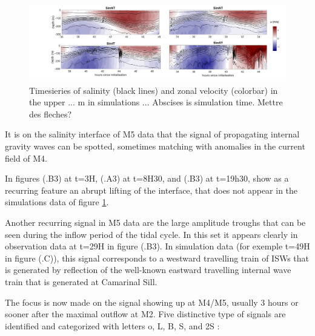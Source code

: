 \begin{figure}[!h]
 \includegraphics[width=\textwidth]{./GBR3D/US_M4SimMIV.png}
 \caption {Timesieries of salinity (black lines) and zonal velocity (colorbar) in the upper ... m in simulations ... Abscises is simulation time. Mettre des fleches?}
 \label{Fig_moor_USs}
\end{figure}

It is on the salinity interface of M5 data that the signal of propagating internal gravity waves can be spotted, sometimes matching with anomalies in the current field of M4.

In figures (.B3) at t=3H, (.A3) at t=8H30, and (.B3) at t=19h30, show as a recurring feature an abrupt lifting of the interface, that does not appear in the simulations data of figure \ref{Fig_moor_USs}.

Another recurring signal in M5 data are the large amplitude troughs that can be seen during the inflow period of the tidal cycle. In this set it appears clearly in observation data at t=29H in figure (.B3). In simulation data (for exemple t=49H in figure (.C)), this signal corresponds to a westward travelling train of ISWs that is generated by reflection of the well-known eastward travelling internal wave train that is generated at Camarinal Sill.

The focus is now made on the signal showing up at M4/M5, usually 3 hours or sooner after the maximal outflow at M2. Five distinctive type of signals are identified and categorized with letters o, L, B, S, and 2S : 

